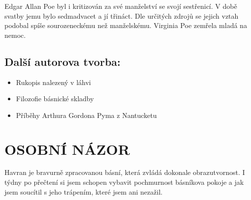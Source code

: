 \documentclass{extarticle} %
\begin{document}
Edgar Allan Poe byl i kritizován za své manželství se svojí sestřenicí. V době svatby jemu bylo sedmadvacet a jí třináct. Dle určitých zdrojů se jejich vztah podobal spíše sourozeneckému než manželskému. Virginia Poe zemřela mladá na nemoc.


\subsection*{Další autorova tvorba:}
\noindent 
\begin{itemize}
    \item Rukopis nalezený v láhvi
    \item Filozofie básnické skladby
    \item Příběhy Arthura Gordona Pyma z Nantucketu
    
\end{itemize}






\section*{OSOBNÍ NÁZOR}
\noindent 
Havran je bravurně zpracovanou básní, která zvládá dokonale obrazutvornost. I týdny po přečtení si jsem schopen vybavit pochmurnost básníkova pokoje a jak jsem soucítil s jeho trápením, které jsem ani nezažil.
\end{document}
